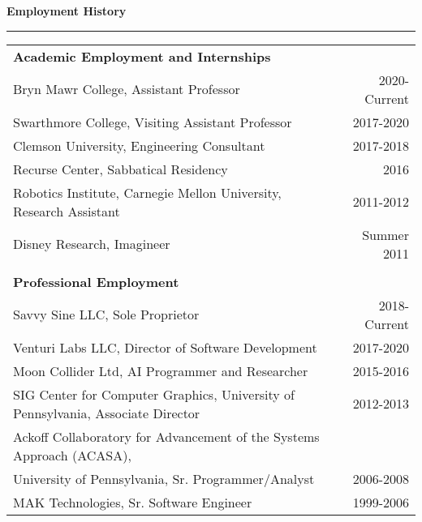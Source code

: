\needspace{6em}
{\Large {\bf Employment History}} 
\vspace{0.1cm}
\hrule
\medskip

\begin{tabular*}{7.1in}{@{}l@{\extracolsep\fill}r}
{\bf Academic Employment and Internships} \\
Bryn Mawr College, Assistant Professor & 2020-Current\\
Swarthmore College, Visiting Assistant Professor & 2017-2020\\
Clemson University, Engineering Consultant & 2017-2018\\
Recurse Center, Sabbatical Residency & 2016\\
Robotics Institute, Carnegie Mellon University, Research Assistant & 2011-2012\\
Disney Research, Imagineer & Summer 2011\\
\phantom{yommomma} & \phantom{2002}\\
{\bf Professional Employment} \\
Savvy Sine LLC, Sole Proprietor & 2018-Current\\ 
Venturi Labs LLC, Director of Software Development & 2017-2020\\
Moon Collider Ltd, AI Programmer and Researcher & 2015-2016\\
SIG Center for Computer Graphics, University of Pennsylvania, Associate Director & 2012-2013\\
Ackoff Collaboratory for Advancement of the Systems Approach (ACASA), \\
  University of Pennsylvania, Sr. Programmer/Analyst & 2006-2008\\
MAK Technologies, Sr. Software Engineer & 1999-2006\\
\end{tabular*}




